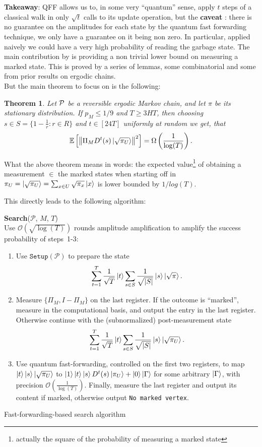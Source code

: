 \documentclass{article}
\newcommand{\nrm}[1]{\left\lVert #1 \right\rVert}
\newcommand{\bigO}[1]{\mathcal{O}\left( #1 \right)}
\newcommand{\PM}{\mathcal{P}}
\newtheorem{theorem}{Theorem}
\newcommand{\setup}{\mathtt{Setup}}
\begin{document}
\textbf{Takeaway}: QFF allows us to, in some very ``quantum'' sense, apply $t$ steps of a classical walk in only $\sqrt{t}$ calls to its update operation, but the \textbf{caveat} : there is no guarantee on the amplitudes for each state by the quantum fast forwarding technique, we only have a guarantee on it being non zero. In particular, applied naively we could have a very high probability of reading the garbage state.
The main contribution by \cite{Ambainis2019QuadraticSF} is providing a non trivial lower bound on measuring a marked state. This is proved by a series of lemmas, some combinatorial and some from prior results on ergodic chains. \\ But the main theorem to focus on is the following:
\begin{theorem}
	Let $\cal P$ be a reversible ergodic Markov chain, and let $\pi$ be its stationary distribution.
	If $p_M\leq 1/9$ and $T\geq 3HT$, then choosing $s\in S=\{1-\frac{1}{r}:r\in R\}$ and $t\in [24T]$ uniformly at random we get, that 
	$$\mathbb{E}\left[\nrm{\Pi_M D^t(s)\ket{\sqrt{\pi_U}}}^2\right]= \Omega\left(\frac{1}{\log(T)}\right).$$
\end{theorem}\label{cor:AMRMS}
What the above theorem \label{cor:AMRMS} means in words: the expected value\footnote{actually the square of the probability of measuring a marked state} of obtaining a measurement $\in$ the marked states when starting off in $\pi_U =\ket{\sqrt{\pi_U}}=\sum_{x\in U}\sqrt{\pi_x}\ket{x}$ is lower bounded by $1/log(T)$.

This directly leads to the following algorithm:

\begin{algorithm}[H]
	\textbf{Search}($ \PM $, $ M $, $T$)\\ %
	Use $\bigO{\!\!\sqrt{\log(T)}}\!$ rounds amplitude amplification to amplify the success probability of steps~1-$3$:
	\begin{enumerate}
		\item Use $\setup(\PM)$ to prepare the state $$\sum_{t=1}^{T}\frac{1}{\sqrt{T}}\ket{t}\sum_{s\in S}\frac{1}{\sqrt{|S|}}\ket{s}\ket{\sqrt{\pi}}.$$
		\item Measure $\{\Pi_M,I-\Pi_M\}$ on the last register. If the outcome is ``marked'', measure in the computational basis, and output the entry in the last register. Otherwise continue with the (subnormalized) post-measurement state %
		$$\sum_{t=1}^{T}\frac{1}{\sqrt{T}}\ket{t}\sum_{s\in S}\frac{1}{\sqrt{|S|}}\ket{s}\ket{\sqrt{\pi_U}}.$$
		\item Use quantum fast-forwarding, controlled on the first two registers, to map $\ket{t}\ket{s}\ket{\sqrt{\pi_U}}$ to $\ket{1}\ket{t}\ket{s}D^t(s)\ket{\pi_U}+\ket{0}\ket{\Gamma}$ for some arbitrary $\ket{\Gamma}$, with precision $\bigO{\frac{1}{\log(T)}}$. Finally, measure the last register and output its content if marked, otherwise output \texttt{No marked vertex}.
	\end{enumerate}
	\caption{Fast-forwarding-based search algorithm}\label{alg:alg2}
\end{algorithm}
\end{document}
